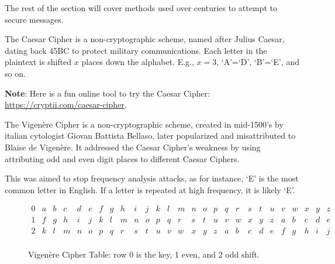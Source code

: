 \noindent
The rest of the section will cover methods used over centuries to attempt to secure messages.

\begin{theo}

    \label{theo:caesar_cipher}
    The Caesar Cipher is a non-cryptographic scheme, named after Julius Caesar, dating back 45BC to protect military communications.
    Each letter in the plaintext is shifted $x$ places down the alphabet. E.g., $x= 3$, `A'=`D', `B'=`E', and so on. \hfill \cite{timour2019crypto}
\end{theo}

\vspace{-1em}
\begin{Note}
    \textbf{Note}: Here is a fun online tool to try the Caesar Cipher: \href{https://cryptii.com/pipes/caesar-cipher}{https://cryptii.com/caesar-cipher}.
\end{Note}

\begin{theo}

    \label{theo:vigenere_cipher}
    The Vigenère Cipher is a non-cryptographic scheme, created in mid-1500's by italian cytologist Giovan Battista Bellaso,
    later popularized and misattributed to Blaise de Vigenère. It addressed the Caesar Cipher's weakness by using attributing odd and even digit places to different Caesar Ciphers.

    This was aimed to stop frequency analysis attacks, as for instance, `E' is the most common letter in English. If a letter is repeated at high frequency, it is likely `E'. \hfill \cite{timour2019crypto}
\end{theo}
\begin{figure}[h!]
    \centering
    \[
    \begin{array}{c|c|c|c|c|c|c|c|c|c|c|c|c|c|c|c|c|c|c|c|c|c|c|c|c|c|c}
    
    0 & a & b & c & d & e & f & g & h & i & j & k & l & m & n & o & p & q & r & s & t & u & v & w & x & y & z \\ \hline\hline
    1 & f & g & h & i & j & k & l & m & n & o & p & q & r & s & t & u & v & w & x & y & z & a & b & c & d & e \\ \hline
    2 & k & l & m & n & o & p & q & r & s & t & u & v & w & x & y & z & a & b & c & d & e & f & g & h & i & j \\
    \end{array}
    \]
    \caption{Vigenère Cipher Table: row 0 is the key, 1 even, and 2 odd shift.}
    \label{fig:caesar_shift_table}
\end{figure}

